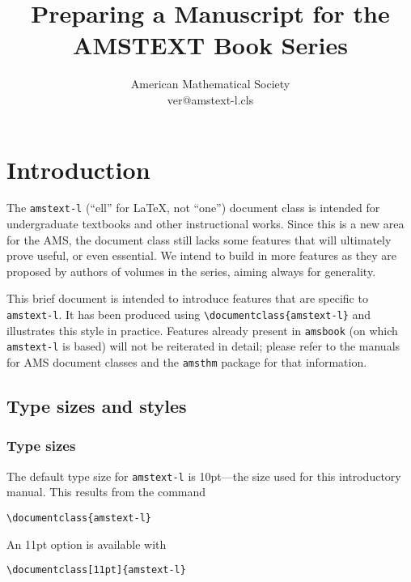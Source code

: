 \documentclass[multixcb]{amstext-l}
\theoremstyle{plain}
\theoremstyle{definition}
\newenvironment{exm}{%
  \par
  \begingroup
    \parindent0pt
    \leftskip2\normalparindent
    \obeylines
}{%
    \par
  \endgroup
}
\begin{document}
\frontmatter

\makeatletter
\def\currversion{\csname ver@amstext-l.cls\endcsname}
\makeatother

\title{Preparing a Manuscript for the\\ AMSTEXT Book Series}
\author{American Mathematical Society\\[12pt]
        \smaller \currversion}

\maketitle

\tableofcontents

\mainmatter

\chapter{Introduction}

The \texttt{amstext-l} (``ell'' for \LaTeX, not ``one'') document class
is intended for undergraduate textbooks and other instructional works.
Since this is a new area for the AMS, the document class still lacks
some features that will ultimately prove useful, or even essential.  We
intend to build in more features as they are proposed by authors of
volumes in the series, aiming always for generality.

This brief document is intended to introduce features that are
specific to \texttt{amstext-l}.  It has been produced using
\verb+\documentclass{amstext-l}+ and illustrates this style in
practice.  Features already present in \texttt{amsbook} (on which
\texttt{amstext-l} is based) will not be reiterated in detail;
please refer to the manuals for AMS document classes \cite{INSTR}
and the \texttt{amsthm} package \cite{THM} for that information.

\section{Type sizes and styles}

\subsection{Type sizes}

The default type size for \texttt{amstext-l} is 10pt---the size
used for this introductory manual.  This results from the command
\begin{exm}
\verb+\documentclass{amstext-l}+
\end{exm}
\noindent
An 11pt option is available with
\begin{exm}
\verb+\documentclass[11pt]{amstext-l}+
\end{exm}
\end{document}
